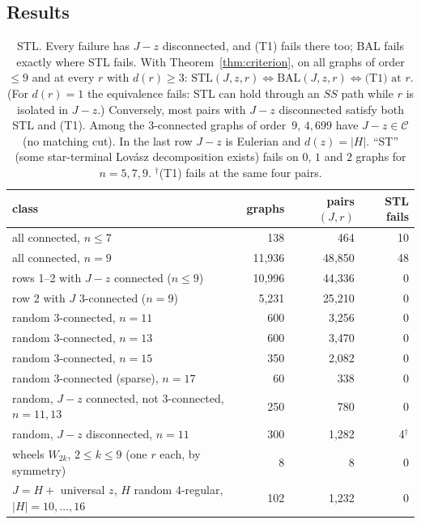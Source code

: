 \documentclass[11pt]{amsart}
\theoremstyle{definition}
\newcommand{\STL}{\mathrm{STL}}
\begin{document}
\subsection{Results}
\begin{table}[!ht]
\centering\footnotesize
\begin{tabular}{@{}lrrr@{}}
\toprule
class & graphs & pairs $(J,r)$ & STL fails\\
\midrule
all connected, $n\le7$ & 138 & 464 & 10\\
all connected, $n=9$ & 11{,}936 & 48{,}850 & 48\\
\quad rows 1--2 with $J-z$ connected ($n\le9$) & 10{,}996 & 44{,}336 & 0\\
\quad row 2 with $J$ $3$-connected ($n=9$) & 5{,}231 & 25{,}210 & 0\\
random $3$-connected, $n=11$ & 600 & 3{,}256 & 0\\
random $3$-connected, $n=13$ & 600 & 3{,}470 & 0\\
random $3$-connected, $n=15$ & 350 & 2{,}082 & 0\\
random $3$-connected (sparse), $n=17$ & 60 & 338 & 0\\
random, $J-z$ connected, not $3$-connected, $n=11,13$ & 250 & 780 & 0\\
random, $J-z$ disconnected, $n=11$ & 300 & 1{,}282 & 4$^\dagger$\\
wheels $W_{2k}$, $2\le k\le 9$ (one $r$ each, by symmetry) & 8 & 8 & 0\\
$J=H+$ universal $z$, $H$ random $4$-regular, $|H|=10,\dots,16$ & 102 & 1{,}232 & 0\\
\bottomrule
\end{tabular}
\caption{STL. Every failure has $J-z$ disconnected, and (T1) fails there too; BAL fails exactly
where STL fails. With Theorem~\ref{thm:criterion}, on all graphs of order $\le9$ and at every $r$
with $d(r)\ge3$: $\STL(J,z,r)\Leftrightarrow\mathrm{BAL}(J,z,r)\Leftrightarrow\text{(T1) at }r$.
(For $d(r)=1$ the equivalence fails: STL can hold through an $SS$ path while $r$ is isolated in
$J-z$.) Conversely, most pairs with $J-z$ disconnected satisfy both STL and (T1). Among the
$3$-connected graphs of order~$9$, $4{,}699$ have $J-z\in\mathcal C$ (no matching cut). In the last
row $J-z$ is Eulerian and $d(z)=|H|$. ``ST'' (some star-terminal Lov\'asz decomposition exists)
fails on $0$, $1$ and $2$ graphs for $n=5,7,9$. $^\dagger$(T1) fails at the same four pairs.}
\label{tab:stl}
\end{table}
\end{document}
